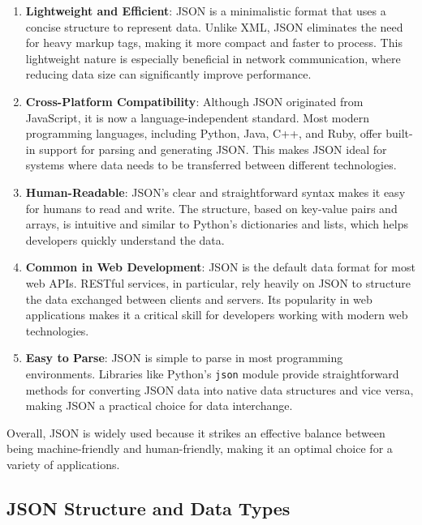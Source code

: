 \documentclass[
  letterpaper,
  DIV=11,
  numbers=noendperiod]{scrreprt}
\begin{document}
\begin{enumerate}
\def\labelenumi{\arabic{enumi}.}
\item
  \textbf{Lightweight and Efficient}: JSON is a minimalistic format that
  uses a concise structure to represent data. Unlike XML, JSON
  eliminates the need for heavy markup tags, making it more compact and
  faster to process. This lightweight nature is especially beneficial in
  network communication, where reducing data size can significantly
  improve performance.
\item
  \textbf{Cross-Platform Compatibility}: Although JSON originated from
  JavaScript, it is now a language-independent standard. Most modern
  programming languages, including Python, Java, C++, and Ruby, offer
  built-in support for parsing and generating JSON. This makes JSON
  ideal for systems where data needs to be transferred between different
  technologies.
\item
  \textbf{Human-Readable}: JSON's clear and straightforward syntax makes
  it easy for humans to read and write. The structure, based on
  key-value pairs and arrays, is intuitive and similar to Python's
  dictionaries and lists, which helps developers quickly understand the
  data.
\item
  \textbf{Common in Web Development}: JSON is the default data format
  for most web APIs. RESTful services, in particular, rely heavily on
  JSON to structure the data exchanged between clients and servers. Its
  popularity in web applications makes it a critical skill for
  developers working with modern web technologies.
\item
  \textbf{Easy to Parse}: JSON is simple to parse in most programming
  environments. Libraries like Python's \texttt{json} module provide
  straightforward methods for converting JSON data into native data
  structures and vice versa, making JSON a practical choice for data
  interchange.
\end{enumerate}

Overall, JSON is widely used because it strikes an effective balance
between being machine-friendly and human-friendly, making it an optimal
choice for a variety of applications.

\hypertarget{json-structure-and-data-types}{%
\subsection{JSON Structure and Data
Types}\label{json-structure-and-data-types}}
\end{document}
